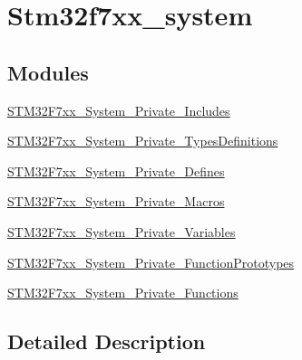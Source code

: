 \hypertarget{group__stm32f7xx__system}{}\section{Stm32f7xx\+\_\+system}
\label{group__stm32f7xx__system}
\subsection*{Modules}
\begin{DoxyCompactItemize}
\item 
\mbox{\hyperlink{group__STM32F7xx__System__Private__Includes}{S\+T\+M32\+F7xx\+\_\+\+System\+\_\+\+Private\+\_\+\+Includes}}
\item 
\mbox{\hyperlink{group__STM32F7xx__System__Private__TypesDefinitions}{S\+T\+M32\+F7xx\+\_\+\+System\+\_\+\+Private\+\_\+\+Types\+Definitions}}
\item 
\mbox{\hyperlink{group__STM32F7xx__System__Private__Defines}{S\+T\+M32\+F7xx\+\_\+\+System\+\_\+\+Private\+\_\+\+Defines}}
\item 
\mbox{\hyperlink{group__STM32F7xx__System__Private__Macros}{S\+T\+M32\+F7xx\+\_\+\+System\+\_\+\+Private\+\_\+\+Macros}}
\item 
\mbox{\hyperlink{group__STM32F7xx__System__Private__Variables}{S\+T\+M32\+F7xx\+\_\+\+System\+\_\+\+Private\+\_\+\+Variables}}
\item 
\mbox{\hyperlink{group__STM32F7xx__System__Private__FunctionPrototypes}{S\+T\+M32\+F7xx\+\_\+\+System\+\_\+\+Private\+\_\+\+Function\+Prototypes}}
\item 
\mbox{\hyperlink{group__STM32F7xx__System__Private__Functions}{S\+T\+M32\+F7xx\+\_\+\+System\+\_\+\+Private\+\_\+\+Functions}}
\end{DoxyCompactItemize}


\subsection{Detailed Description}
